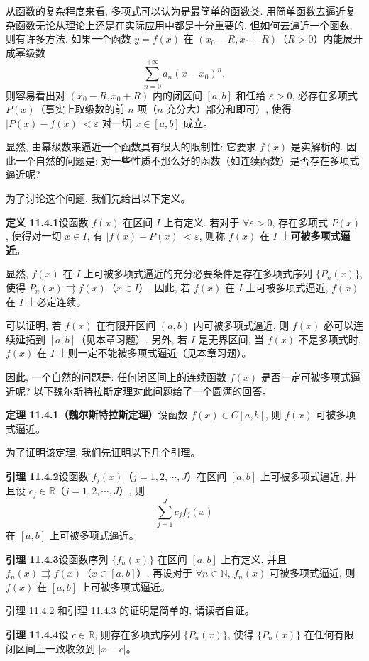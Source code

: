 \documentclass[UTF8,12pt,a4paper,fontset=fandol]{ctexart}
\begin{document}
从函数的复杂程度来看, 多项式可以认为是最简单的函数类. 用简单函数去逼近复杂函数无论从理论上还是在实际应用中都是十分重要的. 但如何去逼近一个函数, 则有许多方法. 如果一个函数 $y=f(x)$ 在 $(x_0-R,x_0+R)$（$R>0$）内能展开成幂级数
\[
  \sum_{n=0}^{+\infty}a_n(x-x_0)^n,
\]
则容易看出对 $(x_0-R,x_0+R)$ 内的闭区间 $[a,b]$ 和任给 $\varepsilon>0$, 必存在多项式 $P(x)$（事实上取级数的前 $n$ 项（$n$ 充分大）部分和即可）, 使得 $|P(x)-f(x)|<\varepsilon$ 对一切 $x\in[a,b]$ 成立。

显然, 由幂级数来逼近一个函数具有很大的限制性: 它要求 $f(x)$ 是实解析的. 因此一个自然的问题是: 对一些性质不那么好的函数（如连续函数）是否存在多项式逼近呢?

为了讨论这个问题, 我们先给出以下定义。

\noindent\textbf{定义 11.4.1}\quad 设函数 $f(x)$ 在区间 $I$ 上有定义. 若对于 $\forall\varepsilon>0$, 存在多项式 $P(x)$, 使得对一切 $x\in I$, 有 $|f(x)-P(x)|<\varepsilon$, 则称 $f(x)$ 在 $I$ 上\textbf{可被多项式逼近}。

显然, $f(x)$ 在 $I$ 上可被多项式逼近的充分必要条件是存在多项式序列 $\{P_n(x)\}$, 使得 $P_n(x)\rightrightarrows f(x)$（$x\in I$）. 因此, 若 $f(x)$ 在 $I$ 上可被多项式逼近, $f(x)$ 在 $I$ 上必定连续。

可以证明, 若 $f(x)$ 在有限开区间 $(a,b)$ 内可被多项式逼近, 则 $f(x)$ 必可以连续延拓到 $[a,b]$（见本章习题）. 另外, 若 $I$ 是无界区间, 当 $f(x)$ 不是多项式时, $f(x)$ 在 $I$ 上则一定不能被多项式逼近（见本章习题）。

因此, 一个自然的问题是: 任何闭区间上的连续函数 $f(x)$ 是否一定可被多项式逼近呢? 以下魏尔斯特拉斯定理对此问题给了一个圆满的回答。

\noindent\textbf{定理 11.4.1（魏尔斯特拉斯定理）}\quad 设函数 $f(x)\in C[a,b]$, 则 $f(x)$ 可被多项式逼近。

为了证明该定理, 我们先证明以下几个引理。

\noindent\textbf{引理 11.4.2}\quad 设函数 $f_j(x)$（$j=1,2,\cdots,J$）在区间 $[a,b]$ 上可被多项式逼近, 并且设 $c_j\in\mathbb R$（$j=1,2,\cdots,J$）, 则
\[
  \sum_{j=1}^{J}c_jf_j(x)
\]
在 $[a,b]$ 上可被多项式逼近。

\noindent\textbf{引理 11.4.3}\quad 设函数序列 $\{f_n(x)\}$ 在区间 $[a,b]$ 上有定义, 并且 $f_n(x)\rightrightarrows f(x)$（$x\in[a,b]$）, 再设对于 $\forall n\in\mathbb N$, $f_n(x)$ 可被多项式逼近, 则 $f(x)$ 在 $[a,b]$ 上可被多项式逼近。

引理 11.4.2 和引理 11.4.3 的证明是简单的, 请读者自证。

\noindent\textbf{引理 11.4.4}\quad 设 $c\in\mathbb R$, 则存在多项式序列 $\{P_n(x)\}$, 使得 $\{P_n(x)\}$ 在任何有限闭区间上一致收敛到 $|x-c|$。
\end{document}
